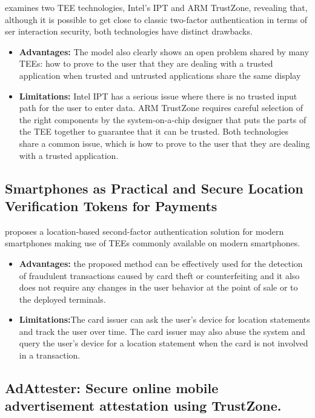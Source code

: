 \documentclass[conference]{IEEEtran}
\begin{document}
examines two TEE technologies, Intel’s IPT and ARM TrustZone, revealing that, although it is possible to get close to classic two-factor authentication in terms of ser interaction security, both technologies have distinct drawbacks.
\begin{itemize}
    \item \textbf{Advantages:} The model also clearly shows an open problem shared by many TEEs: how to prove to the user that they are dealing with a trusted application when trusted and untrusted applications share the same display
    \item \textbf{Limitations:} Intel IPT has a serious issue where there is no trusted input path for the user to enter data. ARM TrustZone requires careful selection of the right components by the system-on-a-chip designer that puts the parts of the TEE together to guarantee that it can be trusted. Both technologies share a common issue, which is how to prove to the user that they are dealing with a trusted application.
\end{itemize}


\subsection{Smartphones as Practical and Secure Location Verification Tokens for Payments}

proposes a location-based second-factor authentication solution for modern smartphones making use of TEEs commonly available on modern smartphones.
\begin{itemize}
    \item \textbf{Advantages:} the proposed method can be effectively used for the detection of fraudulent transactions caused by card theft or counterfeiting and it also does not require any changes in the user behavior at the point of sale or to the deployed terminals.
    \item \textbf{Limitations:}The card issuer can ask the user’s device for location statements and track the user over time. The card issuer may also abuse the system and query the user’s device for a location statement when the card is not involved in a transaction.
\end{itemize}


\subsection{AdAttester: Secure online mobile advertisement attestation using TrustZone.}
\end{document}
